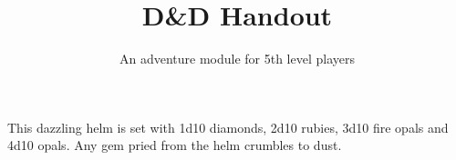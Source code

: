 \documentclass[theme=dnd]{rpghandout}
\title{D\&D Handout}
\subtitle{An adventure module for 5th level players}
\begin{document}
    \maketitle{}

    This dazzling helm is set with 1d10 diamonds, 2d10 rubies, 3d10 fire opals and 4d10 opals. Any gem pried from the helm crumbles to dust.

	\Blindtext{}
\end{document}
